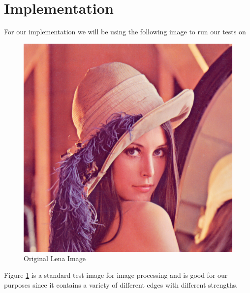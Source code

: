 \documentclass{article}
\begin{document}
\section{Implementation}
For our implementation we will be using the following image to run our tests on
\begin{figure}[H]
  \centering
  \includegraphics[scale=0.5]{Images/lena/lena_orig.png}
  \caption{Original Lena Image}
  \label{lena_o}
\end{figure}
Figure \ref{lena_o} is a standard test image for image processing and is good for our purposes since it contains a variety of different edges with different strengths.
\end{document}
